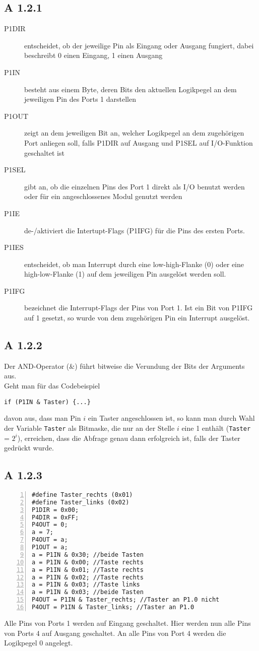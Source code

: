\documentclass[11pt,a4paper,ngerman]{article}
\begin{document}
\subsection*{A 1.2.1}
\begin{description}
\item[P1DIR] entscheidet, ob der jeweilige Pin als Eingang oder Ausgang fungiert, dabei beschreibt 0 einen Eingang, 1 einen Ausgang
\item[P1IN] besteht aus einem Byte, deren Bits den aktuellen Logikpegel an dem jeweiligen Pin des Ports 1 darstellen
\item[P1OUT] zeigt an dem jeweiligen Bit an, welcher Logikpegel an dem zugehörigen Port anliegen soll, falls P1DIR auf Ausgang und P1SEL auf I/O-Funktion geschaltet ist
\item[P1SEL] gibt an, ob die einzelnen Pins des Port 1 direkt als I/O benutzt werden oder für ein angeschlossenes Modul genutzt werden
\item[P1IE] de-/aktiviert die Intertupt-Flags (P1IFG) für die Pins des ersten Ports.
\item[P1IES] entscheidet, ob man Interrupt durch eine low-high-Flanke (0) oder eine high-low-Flanke (1) auf dem jeweiligen Pin ausgelöst werden soll.
\item[P1IFG] bezeichnet die Interrupt-Flags der Pins von Port 1. Ist ein Bit von P1IFG auf 1 gesetzt, so wurde von dem zugehörigen Pin ein Interrupt ausgelöst.
\end{description}

\subsection*{A 1.2.2}
Der AND-Operator (\&) führt bitweise die Verundung der Bits der Arguments aus.\\
Geht man für das Codebeispiel
\begin{lstlisting}
if (P1IN & Taster) {...}
\end{lstlisting}
davon aus, dass man Pin $i$ ein Taster angeschlossen ist, so kann man durch Wahl der Variable \texttt{Taster} als Bitmaske, die nur an der Stelle $i$ eine 1 enthält (\texttt{Taster} = $2^i$), erreichen, dass die Abfrage genau dann erfolgreich ist, falls der Taster gedrückt wurde.
\subsection*{A 1.2.3}
\begin{lstlisting}[numbers=left]
#define Taster_rechts (0x01)
#define Taster_links (0x02)
P1DIR = 0x00;
P4DIR = 0xFF;
P4OUT = 0;
a = 7;
P4OUT = a;
P1OUT = a;
a = P1IN & 0x30; //beide Tasten
a = P1IN & 0x00; //Taste rechts
a = P1IN & 0x01; //Taste rechts
a = P1IN & 0x02; //Taste rechts
a = P1IN & 0x03; //Taste links
a = P1IN & 0x03; //beide Tasten
P4OUT = P1IN & Taster_rechts; //Taster an P1.0 nicht
P4OUT = P1IN & Taster_links; //Taster an P1.0
\end{lstlisting}
Alle Pins von Ports 1 werden auf Eingang geschaltet.
Hier werden nun alle Pins von Ports 4 auf Ausgang geschaltet.
An alle Pins von Port 4 werden die Logikpegel 0 angelegt.
\end{document}
